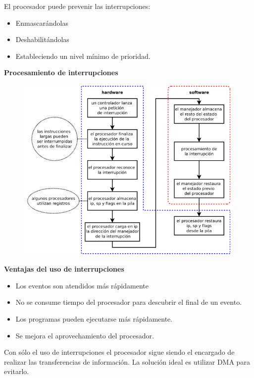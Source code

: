 \documentclass{article}
\begin{document}
El procesador puede prevenir las interrupciones:
\begin{itemize}
\item Enmascarándolas

\item Deshabilitándolas

\item Estableciendo un nivel mínimo de prioridad.
\end{itemize}

\textbf{Procesamiento de interrupciones}
\begin{figure}[h]
\centering
\includegraphics[scale=1,width=\textwidth]{procinterrupcion.png}
\end{figure}

\textbf{Ventajas del uso de interrupciones}
\begin{itemize}
\item Los eventos son atendidos más rápidamente

\item No se consume tiempo del procesador para descubrir el final de un evento.

\item Los programas pueden ejecutarse más rápidamente.

\item Se mejora el aprovechamiento del procesador.
\end{itemize}

Con sólo el uso de interrupciones el procesador sigue siendo el encargado de realizar las transferencias de información. La solución ideal es utilizar DMA para evitarlo.\\
\end{document}
